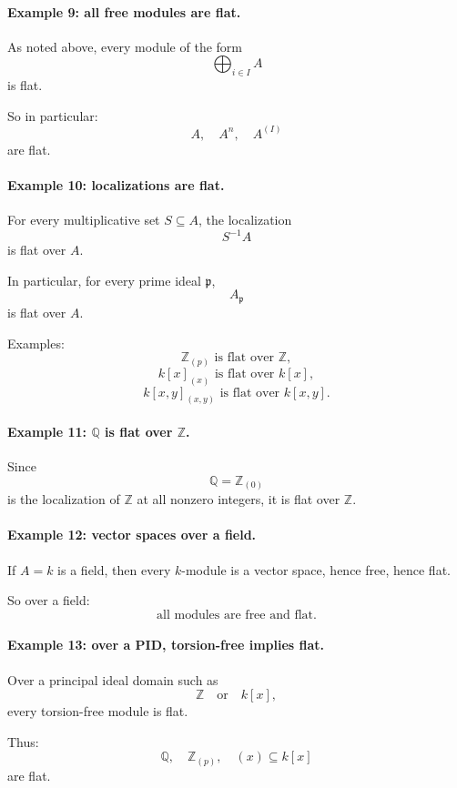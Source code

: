 \documentclass[12pt,a4paper]{article}
\theoremstyle{notespace}
\theoremstyle{definition}
\begin{document}
\paragraph{Example 9: all free modules are flat.}

As noted above, every module of the form
\[
\bigoplus_{i\in I} A
\]
is flat.

So in particular:
\[
A,\quad A^n,\quad A^{(I)}
\]
are flat.

\paragraph{Example 10: localizations are flat.}

For every multiplicative set \(S\subseteq A\), the localization
\[
S^{-1}A
\]
is flat over \(A\).

In particular, for every prime ideal \(\mathfrak p\),
\[
A_{\mathfrak p}
\]
is flat over \(A\).

Examples:
\[
\mathbb Z_{(p)} \text{ is flat over } \mathbb Z,
\]
\[
k[x]_{(x)} \text{ is flat over } k[x],
\]
\[
k[x,y]_{(x,y)} \text{ is flat over } k[x,y].
\]

\paragraph{Example 11: \(\mathbb Q\) is flat over \(\mathbb Z\).}

Since
\[
\mathbb Q = \mathbb Z_{(0)}
\]
is the localization of \(\mathbb Z\) at all nonzero integers, it is flat over \(\mathbb Z\).

\paragraph{Example 12: vector spaces over a field.}

If \(A=k\) is a field, then every \(k\)-module is a vector space, hence free, hence flat.

So over a field:
\[
\text{all modules are free and flat.}
\]

\paragraph{Example 13: over a PID, torsion-free implies flat.}

Over a principal ideal domain such as
\[
\mathbb Z
\quad\text{or}\quad
k[x],
\]
every torsion-free module is flat.

Thus:
\[
\mathbb Q,\quad \mathbb Z_{(p)},\quad (x)\subseteq k[x]
\]
are flat.
\end{document}

